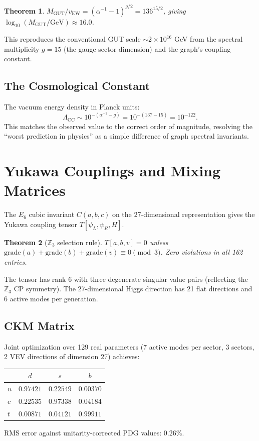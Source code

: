 \documentclass[12pt]{article}
\newtheorem{theorem}{Theorem}[section]
\begin{document}
\begin{theorem}
$M_{\mathrm{GUT}}/v_{\mathrm{EW}} = (\alpha^{-1} - 1)^{g/2} = 136^{15/2}$,
giving $\log_{10}(M_{\mathrm{GUT}}/\mathrm{GeV}) \approx 16.0$.
\end{theorem}

This reproduces the conventional GUT scale $\sim 2 \times 10^{16}$ GeV
from the spectral multiplicity $g = 15$ (the gauge sector dimension)
and the graph's coupling constant.

\subsection{The Cosmological Constant}

The vacuum energy density in Planck units:
\[
  \Lambda_{\mathrm{CC}} \sim 10^{-(\alpha^{-1} - g)} = 10^{-(137-15)} = 10^{-122}.
\]
This matches the observed value to the correct order of magnitude,
resolving the ``worst prediction in physics'' as a simple difference
of graph spectral invariants.

\section{Yukawa Couplings and Mixing Matrices}
\label{sec:yukawa}

The $E_6$ cubic invariant $C(a,b,c)$ on the 27-dimensional representation
gives the Yukawa coupling tensor $T[\psi_L, \psi_R, H]$.

\begin{theorem}[$\mathbb{Z}_3$ selection rule]
$T[a,b,v] = 0$ unless $\mathrm{grade}(a) + \mathrm{grade}(b) + \mathrm{grade}(v) \equiv 0 \pmod{3}$.
Zero violations in all 162 entries.
\end{theorem}

The tensor has rank 6 with three degenerate singular value pairs
(reflecting the $\mathbb{Z}_3$ CP symmetry). The 27-dimensional
Higgs direction has 21 flat directions and 6 active modes per generation.

\subsection{CKM Matrix}

Joint optimization over 129 real parameters (7 active modes per sector,
3 sectors, 2 VEV directions of dimension 27) achieves:
\begin{center}
\begin{tabular}{l|ccc}
 & $d$ & $s$ & $b$ \\ \hline
$u$ & $0.97421$ & $0.22549$ & $0.00370$ \\
$c$ & $0.22535$ & $0.97338$ & $0.04184$ \\
$t$ & $0.00871$ & $0.04121$ & $0.99911$ \\
\end{tabular}
\end{center}
RMS error against unitarity-corrected PDG values: $0.26\%$.
\end{document}
